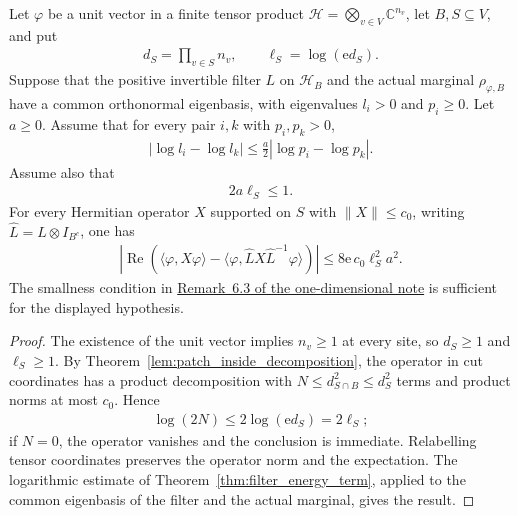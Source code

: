 \begin{theorem}
    \label{thm:split_filter_conjugation_logarithmic}
    \leanok
    Let $\varphi$ be a unit vector in a finite tensor product
    $\mathcal H=\bigotimes_{v\in V}\mathbb C^{n_v}$, let $B,S\subseteq V$,
    and put
    \begin{align*}
        d_S=\prod_{v\in S}n_v,\qquad \ell_S=\log(\mathrm e d_S).
    \end{align*}
    Suppose that the positive invertible filter $L$ on $\mathcal H_B$
    and the actual marginal $\rho_{\varphi,B}$ have a common
    orthonormal eigenbasis, with eigenvalues $l_i>0$ and $p_i\ge0$.
    Let $a\ge0$. Assume that for every pair $i,k$ with
    $p_i,p_k>0$,
    \begin{align*}
        |\log l_i-\log l_k|
        \le\frac a2|\log p_i-\log p_k|.
    \end{align*}
    Assume also that
    \begin{align*}
        2a\ell_S\le1.
    \end{align*}
    For every Hermitian operator $X$ supported on $S$ with
    $\lVert X\rVert\le c_0$, writing
    $\widehat L=L\otimes I_{B^c}$, one has
    \begin{align*}
        \left|\operatorname{Re}\left(
        \langle\varphi,X\varphi\rangle
        -\langle\varphi,\widehat L X\widehat L^{-1}\varphi\rangle
        \right)\right|
        \le8\mathrm e\,c_0\ell_S^2a^2.
    \end{align*}
    The smallness condition in
    \href{https://github.com/LionSR/TNLean/blob/67ea93e29f7c088f766b271208a2fde4cccf04a6/docs/notes/one_dimensional_note/part1_arealaw.tex#L711-L734}{Remark~6.3 of the one-dimensional note}
    is sufficient for the displayed hypothesis.
\end{theorem}
\begin{proof}\leanok
    The existence of the unit vector implies $n_v\ge1$ at every site,
    so $d_S\ge1$ and $\ell_S\ge1$. By
    Theorem~\ref{lem:patch_inside_decomposition}, the operator in cut
    coordinates has a product decomposition with
    $N\le d_{S\cap B}^2\le d_S^2$ terms and product norms at most
    $c_0$. Hence
    \begin{align*}
        \log(2N)\le2\log(\mathrm e d_S)=2\ell_S;
    \end{align*}
    if $N=0$, the operator vanishes and the conclusion is immediate.
    Relabelling tensor coordinates preserves the operator norm and
    the expectation. The logarithmic estimate of
    Theorem~\ref{thm:filter_energy_term}, applied to the common
    eigenbasis of the filter and the actual marginal, gives the result.
\end{proof}

